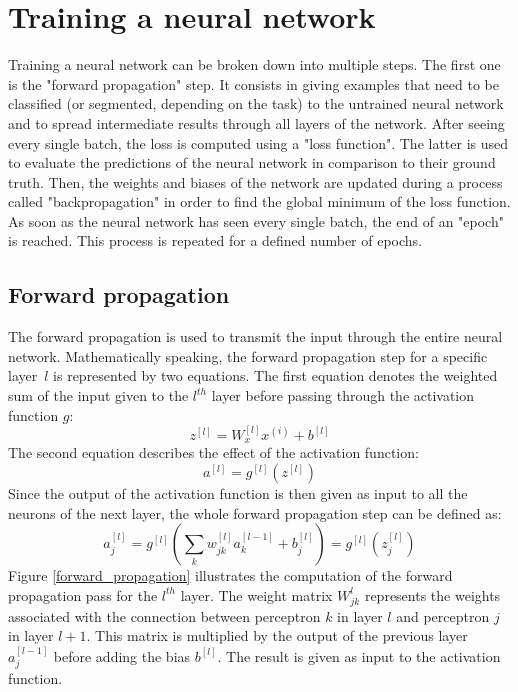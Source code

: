 \section{Training a neural network}
\label{training_a_neural_network}

\setlength{\marginparwidth}{3cm}\leavevmode {}Training a neural network can be broken down into multiple steps. The first one is the "forward propagation" step. It consists in giving examples that need to be classified (or segmented, depending on the task) to the untrained neural network and to spread intermediate results through all layers of the network. %
After seeing every single batch, the loss is computed using a "loss function". The latter is used to evaluate the predictions of the neural network in comparison to their ground truth. Then, the weights and biases of the network are updated during a process called "backpropagation" in order to find the global minimum of the loss function. As soon as the neural network has seen every single batch, the end of an "epoch" is reached. This process is repeated for a defined number of epochs.


\subsection{Forward propagation}

\setlength{\marginparwidth}{3cm}\leavevmode {}The forward propagation is used to transmit the input through the entire neural network. Mathematically speaking, the forward propagation step for a specific \mbox{layer $l$} is represented by two equations. The first equation denotes the weighted sum of the input given to the $l^{th}$ layer before passing through the activation function $g$: 
\begin{equation}
z^{[l]} = W_{x}^{[l]}x^{(i)} + b^{[l]}
\end{equation}
The second equation describes the effect of the activation function:
\begin{equation}
a^{[l]} = g^{[l]}(z^{[l]})
\end{equation}
Since the output of the activation function is then given as input to all the neurons of the next layer, the whole forward propagation step can be defined as:
\begin{equation}
a_{j}^{[l]} = g^{[l]} (\sum_{k} w_{jk}^{[l]}a_{k}^{[l-1]} + b_{j}^{[l]}) = g^{[l]} (z_{j}^{[l]}) 
\end{equation}
Figure \ref{forward_propagation} illustrates the computation of the forward propagation pass for the $l^{th}$ layer. The weight matrix $W_{jk}^{l}$ represents the weights associated with the connection between perceptron $k$ in layer $l$ and perceptron $j$ in layer $l+1$. This matrix is multiplied by the output of the previous layer $a_{j}^{[l-1]}$ before adding the bias $b^{[l]}$. The result is given as input to the activation function.


